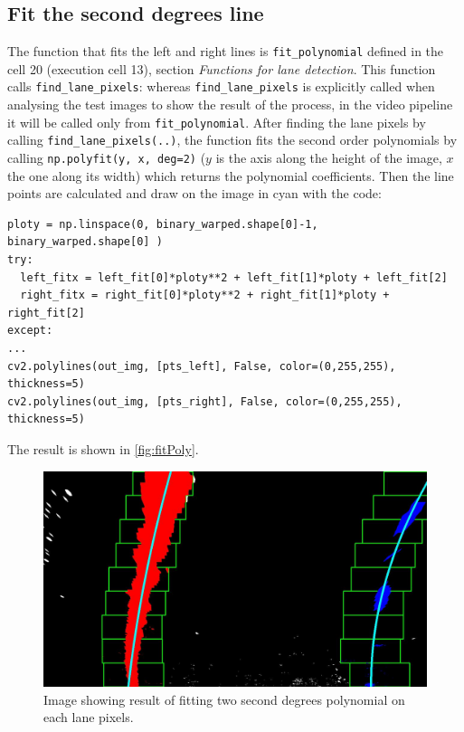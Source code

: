 \documentclass{article}
\let\cd\lstinline
\begin{document}
\subsection{Fit the second degrees line}
The function that fits the left and right lines is \cd+fit_polynomial+ defined in the cell 20 (execution cell 13), section \textit{Functions for lane detection}. This function calls \cd+find_lane_pixels+: whereas \cd+find_lane_pixels+ is explicitly called when analysing the test images to show the result of the process, in the video pipeline it will be called only from \cd+fit_polynomial+. After finding the lane pixels by calling \cd+find_lane_pixels(..)+, the function fits the second order polynomials by calling \cd+np.polyfit(y, x, deg=2)+ ($y$ is the axis along the height of the image, $x$ the one along its width) which returns the polynomial coefficients. Then the line points are calculated and draw on the image in cyan with the code:
\begin{lstlisting}
ploty = np.linspace(0, binary_warped.shape[0]-1, binary_warped.shape[0] )
try:
  left_fitx = left_fit[0]*ploty**2 + left_fit[1]*ploty + left_fit[2]
  right_fitx = right_fit[0]*ploty**2 + right_fit[1]*ploty + right_fit[2]
except:
...
cv2.polylines(out_img, [pts_left], False, color=(0,255,255),  thickness=5)
cv2.polylines(out_img, [pts_right], False, color=(0,255,255), thickness=5)
\end{lstlisting}
The result is shown in \autoref{fig:fitPoly}.
\begin{figure}
\centering
\includegraphics[scale=0.25]{output_images/test1/10_fit_polynomial}
\caption{Image showing result of fitting two second degrees polynomial on each lane pixels.}
\label{fig:fitPoly}
\end{figure}
\end{document}

